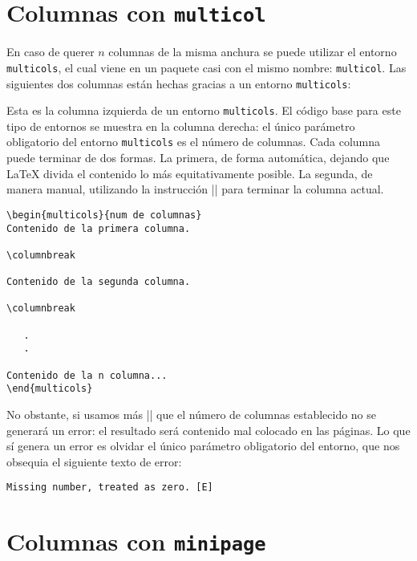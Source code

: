 \section{Columnas con \texttt{multicol}}
\label{sec:columnas_multicol}



En caso de querer $n$ columnas de la misma anchura se puede utilizar el entorno \texttt{multicols}, el cual viene en un paquete casi con el mismo nombre: \texttt{multicol}. Las siguientes dos columnas están hechas gracias a un entorno \texttt{multicols}:

\lstrulet\vspace{-9mm}\begin{multicols}{2}
Esta es la columna izquierda de un entorno \texttt{multicols}. El código base para este tipo de entornos se muestra en la columna derecha: el único parámetro obligatorio del entorno \texttt{multicols} es el número de columnas. Cada columna puede terminar de dos formas. La primera, de forma automática, dejando que \LaTeX{} divida el contenido lo más equitativamente posible. La segunda, de manera manual, utilizando la instrucción |\columnbreak| para terminar la columna actual.

\begin{lstlisting}[style=latex,frame={}]
\begin{multicols}{num de columnas}
Contenido de la primera columna.

\columnbreak

Contenido de la segunda columna.

\columnbreak

   .
   .

Contenido de la n columna...
\end{multicols}
\end{lstlisting}
\end{multicols}\vspace{-6mm}\lstruleb

No obstante, si usamos más |\columnbreak| que el número de columnas establecido no se generará un error: el resultado será contenido mal colocado en las páginas. Lo que sí genera un error es olvidar el único parámetro obligatorio del entorno, que nos obsequia el siguiente texto de error:

\begin{lstlisting}[style=errores]
Missing number, treated as zero. [E]
\end{lstlisting}



\section{Columnas con \texttt{minipage}}
\label{sec:columnas_minipage}



